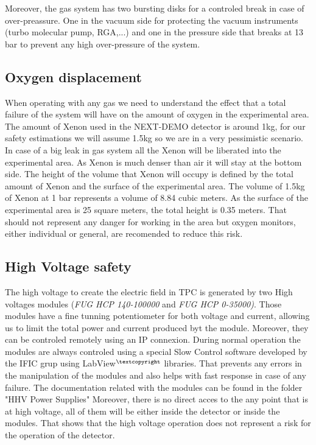 Moreover, the gas system has two bursting disks for a controled break in case of over-preassure. One in the vacuum side for protecting the vacuum instruments (turbo molecular pump, RGA,...) and one in the pressure side that breaks at 13 bar to prevent any high over-pressure of the system.

\subsection{Oxygen displacement}

When operating with any gas we need to understand the effect that a total failure of the system will have on the amount of oxygen in the experimental area. The amount of Xenon used in the NEXT-DEMO detector is around 1kg, for our safety estimations we will assume 1.5kg so we are in a very pessimistic scenario.
In case of a big leak in gas system all the Xenon will be liberated into the experimental area. As Xenon is much denser than air it will stay at the bottom side. The height of the volume that Xenon will occupy is defined by the total amount of Xenon and the surface of the experimental area. The volume of 1.5kg of Xenon at 1 bar represents a volume of 8.84 cubic meters. As the surface of the experimental area is 25 square meters, the total height is 0.35 meters. That should not represent any danger for working in the area but oxygen monitors, either individual or general, are recomended to reduce this risk.


\subsection{High Voltage safety}

The high voltage to create the electric field in TPC is generated by two High voltages modules (\textit{FUG HCP 140-100000} and \textit{FUG HCP 0-35000)}. Those modules have a fine tunning potentiometer for both voltage and current, allowing us to limit the total power and current produced byt the module. Moreover, they can be controled remotely using an IP connexion. During normal operation the modules are always controled using a special Slow Control software developed by the IFIC grup using LabView$^{\textcopyright}$ libraries. That prevents any errors in the manipulation of the modules and also helps with fast response in case of any failure.
The documentation related with the modules can be found in the folder "HHV Power Supplies"
Moreover, there is no direct acces to the any point that is at high voltage, all of them will be either inside the detector or inside the modules. That shows that the high voltage operation does not represent a risk for the operation of the detector.


